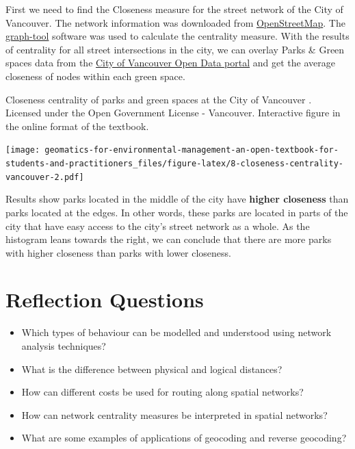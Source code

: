 \documentclass[
]{book}
\providecommand{\tightlist}{%
  \setlength{\itemsep}{0pt}\setlength{\parskip}{0pt}}
\begin{document}
First we need to find the Closeness measure for the street network of the City of Vancouver. The network information was downloaded from \href{https://www.openstreetmap.org/}{OpenStreetMap}. The \href{https://graph-tool.skewed.de/}{graph-tool} software was used to calculate the centrality measure. With the results of centrality for all street intersections in the city, we can overlay Parks \& Green spaces data from the \href{https://opendata.vancouver.ca/explore/dataset/parks-polygon-representation/information/}{City of Vancouver Open Data portal} and get the average closeness of nodes within each green space.

\label{fig:8-closeness-centrality-vancouver}Closeness centrality of parks and green spaces at the City of Vancouver \citep{city_of_vancouver_open_nodate}. Licensed under the Open Government License - Vancouver. Interactive figure in the online format of the textbook.

\texttt{[image: geomatics-for-environmental-management-an-open-textbook-for-students-and-practitioners\_files/figure-latex/8-closeness-centrality-vancouver-2.pdf]}

Results show parks located in the middle of the city have \textbf{higher closeness} than parks located at the edges. In other words, these parks are located in parts of the city that have easy access to the city's street network as a whole. As the histogram leans towards the right, we can conclude that there are more parks with higher closeness than parks with lower closeness.

\section*{Reflection Questions}\label{reflection-questions-5}

\begin{itemize}
\tightlist
\item
  Which types of behaviour can be modelled and understood using network analysis techniques?
\item
  What is the difference between physical and logical distances?
\item
  How can different costs be used for routing along spatial networks?
\item
  How can network centrality measures be interpreted in spatial networks?
\item
  What are some examples of applications of geocoding and reverse geocoding?
\end{itemize}
\end{document}
